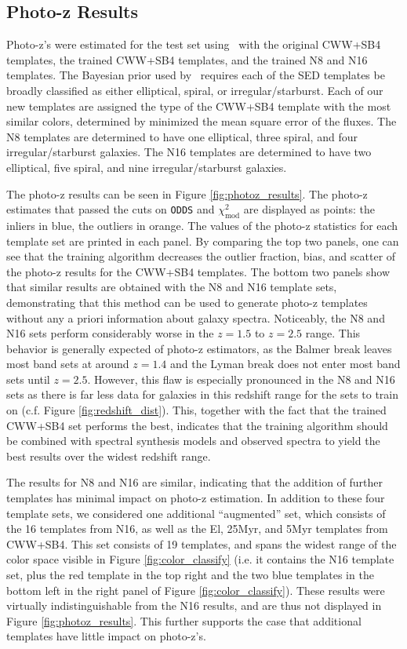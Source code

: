 \subsection{Photo-z Results}
\label{sect:photoz_results}

Photo-z's were estimated for the test set using \bpz\ with the original CWW+SB4 templates, the trained CWW+SB4 templates, and the trained N8 and N16 templates.
The Bayesian prior used by \bpz\ requires each of the SED templates be broadly classified as either elliptical, spiral, or irregular/starburst.
Each of our new templates are assigned the type of the CWW+SB4 template with the most similar colors, determined by minimized the mean square error of the fluxes.
The N8 templates are determined to have one elliptical, three spiral, and four irregular/starburst galaxies.
The N16 templates are determined to have two elliptical, five spiral, and nine irregular/starburst galaxies.

The photo-z results can be seen in Figure \ref{fig:photoz_results}.
The photo-z estimates that passed the cuts on \texttt{ODDS} and $\chi_\text{mod}^2$ are displayed as points: the inliers in blue, the outliers in orange.
The values of the photo-z statistics for each template set are printed in each panel.
By comparing the top two panels, one can see that the training algorithm decreases the outlier fraction, bias, and scatter of the photo-z results for the CWW+SB4 templates.
The bottom two panels show that similar results are obtained with the N8 and N16 template sets, demonstrating that this method can be used to generate photo-z templates without any a priori information about galaxy spectra.
Noticeably, the N8 and N16 sets perform considerably worse in the $z = 1.5$ to $z = 2.5$ range.
This behavior is generally expected of photo-z estimators, as the Balmer break leaves most band sets at around $z=1.4$ and the Lyman break does not enter most band sets until $z=2.5$.
However, this flaw is especially pronounced in the N8 and N16 sets as there is far less data for galaxies in this redshift range for the sets to train on (c.f. Figure \ref{fig:redshift_dist}).
This, together with the fact that the trained CWW+SB4 set performs the best, indicates that the training algorithm should be combined with spectral synthesis models and observed spectra to yield the best results over the widest redshift range.

The results for N8 and N16 are similar, indicating that the addition of further templates has minimal impact on photo-z estimation. 
In addition to these four template sets, we considered one additional ``augmented'' set, which consists of the 16 templates from N16, as well as the El, 25Myr, and 5Myr templates from CWW+SB4.
This set consists of 19 templates, and spans the widest range of the color space visible in Figure \ref{fig:color_classify} (i.e. it contains the N16 template set, plus the red template in the top right and the two blue templates in the bottom left in the right panel of Figure \ref{fig:color_classify}). 
These results were virtually indistinguishable from the N16 results, and are thus not displayed in Figure \ref{fig:photoz_results}.
This further supports the case that additional templates have little impact on photo-z's.

